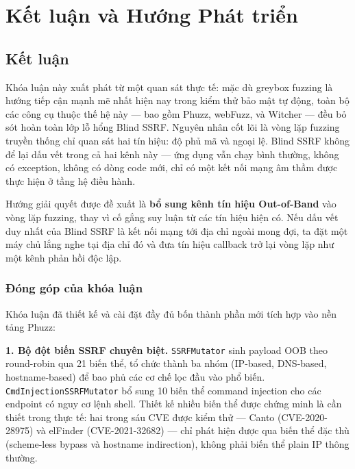 \chapter{Kết luận và Hướng Phát triển}

\section{Kết luận}
\label{sec:conclusion}

Khóa luận này xuất phát từ một quan sát thực tế: mặc dù greybox fuzzing
là hướng tiếp cận mạnh mẽ nhất hiện nay trong kiểm thử bảo mật tự động,
toàn bộ các công cụ thuộc thế hệ này --- bao gồm Phuzz, webFuzz, và
Witcher --- đều bỏ sót hoàn toàn lớp lỗ hổng Blind SSRF. Nguyên nhân
cốt lõi là vòng lặp fuzzing truyền thống chỉ quan sát hai tín hiệu:
độ phủ mã và ngoại lệ. Blind SSRF không để lại dấu vết trong cả hai
kênh này --- ứng dụng vẫn chạy bình thường, không có exception, không
có dòng code mới, chỉ có một kết nối mạng âm thầm được thực hiện ở
tầng hệ điều hành.

Hướng giải quyết được đề xuất là \textbf{bổ sung kênh tín hiệu
Out-of-Band} vào vòng lặp fuzzing, thay vì cố gắng suy luận từ các
tín hiệu hiện có. Nếu dấu vết duy nhất của Blind SSRF là kết nối mạng
tới địa chỉ ngoài mong đợi, ta đặt một máy chủ lắng nghe tại địa chỉ
đó và đưa tín hiệu callback trở lại vòng lặp như một kênh phản hồi độc
lập.

\subsection{Đóng góp của khóa luận}

Khóa luận đã thiết kế và cài đặt đầy đủ bốn thành phần mới tích hợp
vào nền tảng Phuzz:

\textbf{1. Bộ đột biến SSRF chuyên biệt.} \texttt{SSRFMutator} sinh
payload OOB theo round-robin qua 21 biến thể, tổ chức thành ba nhóm
(IP-based, DNS-based, hostname-based) để bao phủ các cơ chế lọc đầu
vào phổ biến. \texttt{CmdInjectionSSRFMutator} bổ sung 10 biến thể
command injection cho các endpoint có nguy cơ lệnh shell. Thiết kế
nhiều biến thể được chứng minh là cần thiết trong thực tế: hai trong
sáu CVE được kiểm thử --- Canto (CVE-2020-28975) và elFinder
(CVE-2021-32682) --- chỉ phát hiện được qua biến thể đặc thù
(scheme-less bypass và hostname indirection), không phải biến thể
plain IP thông thường.

